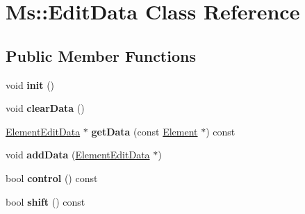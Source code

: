 \hypertarget{class_ms_1_1_edit_data}{}\section{Ms\+:\+:Edit\+Data Class Reference}
\label{class_ms_1_1_edit_data}
\subsection*{Public Member Functions}
\begin{DoxyCompactItemize}
\item 
\mbox{\label{class_ms_1_1_edit_data_ab070b66874127de9ca0ad13cec769388}} 
void {\bfseries init} ()
\item 
\mbox{\label{class_ms_1_1_edit_data_a05154a33bfc8a363ec42ab3435c7a3af}} 
void {\bfseries clear\+Data} ()
\item 
\mbox{\label{class_ms_1_1_edit_data_a0a20233f6c029d8adb7d1e948b9bbaf4}} 
\hyperlink{class_ms_1_1_element_edit_data}{Element\+Edit\+Data} $\ast$ {\bfseries get\+Data} (const \hyperlink{class_ms_1_1_element}{Element} $\ast$) const
\item 
\mbox{\label{class_ms_1_1_edit_data_a519099b10bb58ff91b4cf26fd07ea598}} 
void {\bfseries add\+Data} (\hyperlink{class_ms_1_1_element_edit_data}{Element\+Edit\+Data} $\ast$)
\item 
\mbox{\label{class_ms_1_1_edit_data_a9779d53397b0cb05e7b34262b548657b}} 
bool {\bfseries control} () const
\item 
\mbox{\label{class_ms_1_1_edit_data_ab3c9bf5c1f0c277b6674256f8b826f83}} 
bool {\bfseries shift} () const
\end{DoxyCompactItemize}
